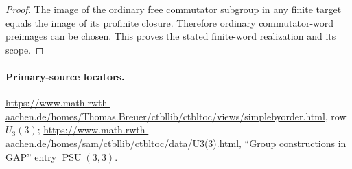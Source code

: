 \begin{proof}
The image of the ordinary free commutator subgroup in any
finite target equals the image of its profinite closure.
Therefore ordinary commutator-word preimages can be chosen.
This proves the stated finite-word realization and its scope.
\end{proof}

\paragraph{Primary-source locators.}
\url{https://www.math.rwth-aachen.de/homes/Thomas.Breuer/ctbllib/ctbltoc/views/simplebyorder.html},
row $U_3(3)$;
\url{https://www.math.rwth-aachen.de/homes/sam/ctbllib/ctbltoc/data/U3(3).html},
``Group constructions in GAP'' entry $\operatorname{PSU}(3,3)$.
